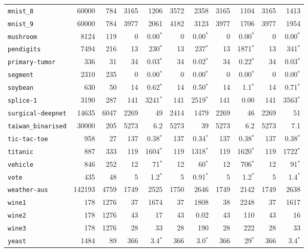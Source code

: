 \begin{tabular}{lccrrrrrrrr}
\texttt{mnist\_8} & \multicolumn{1}{r}{60000} & \multicolumn{1}{r}{784}  & 3165 & 1206 & 3572 & 2358 & 3165 & 1104 & 3165 & 1413\\
\texttt{mnist\_9} & \multicolumn{1}{r}{60000} & \multicolumn{1}{r}{784}  & 3977 & 2061 & 4182 & 3123 & 3977 & 1706 & 3977 & 1954\\
\texttt{mushroom} & \multicolumn{1}{r}{8124} & \multicolumn{1}{r}{119}  & 0 & 0.00$^*$ & 0 & 0.00$^*$ & 0 & 0.00$^*$ & 0 & 0.00$^*$\\
\texttt{pendigits} & \multicolumn{1}{r}{7494} & \multicolumn{1}{r}{216}  & 13 & 230$^*$ & 13 & 237$^*$ & 13 & 1871$^*$ & 13 & 341$^*$\\
\texttt{primary-tumor} & \multicolumn{1}{r}{336} & \multicolumn{1}{r}{31}  & 34 & 0.03$^*$ & 34 & 0.02$^*$ & 34 & 0.22$^*$ & 34 & 0.03$^*$\\
\texttt{segment} & \multicolumn{1}{r}{2310} & \multicolumn{1}{r}{235}  & 0 & 0.00$^*$ & 0 & 0.00$^*$ & 0 & 0.00$^*$ & 0 & 0.00$^*$\\
\texttt{soybean} & \multicolumn{1}{r}{630} & \multicolumn{1}{r}{50}  & 14 & 0.62$^*$ & 14 & 0.50$^*$ & 14 & 1.1$^*$ & 14 & 0.71$^*$\\
\texttt{splice-1} & \multicolumn{1}{r}{3190} & \multicolumn{1}{r}{287}  & 141 & 3241$^*$ & 141 & 2519$^*$ & 141 & 0.00 & 141 & 3563$^*$\\
\texttt{surgical-deepnet} & \multicolumn{1}{r}{14635} & \multicolumn{1}{r}{6047}  & 2269 & 49 & 2414 & 1479 & 2269 & 46 & 2269 & 51\\
\texttt{taiwan\_binarised} & \multicolumn{1}{r}{30000} & \multicolumn{1}{r}{205}  & 5273 & 6.2 & 5273 & 39 & 5273 & 6.2 & 5273 & 7.1\\
\texttt{tic-tac-toe} & \multicolumn{1}{r}{958} & \multicolumn{1}{r}{27}  & 137 & 0.38$^*$ & 137 & 0.34$^*$ & 137 & 0.38$^*$ & 137 & 0.38$^*$\\
\texttt{titanic} & \multicolumn{1}{r}{887} & \multicolumn{1}{r}{333}  & 119 & 1604$^*$ & 119 & 1318$^*$ & 119 & 1620$^*$ & 119 & 1722$^*$\\
\texttt{vehicle} & \multicolumn{1}{r}{846} & \multicolumn{1}{r}{252}  & 12 & 71$^*$ & 12 & 60$^*$ & 12 & 706$^*$ & 12 & 91$^*$\\
\texttt{vote} & \multicolumn{1}{r}{435} & \multicolumn{1}{r}{48}  & 5 & 1.2$^*$ & 5 & 0.91$^*$ & 5 & 1.2$^*$ & 5 & 1.4$^*$\\
\texttt{weather-aus} & \multicolumn{1}{r}{142193} & \multicolumn{1}{r}{4759}  & 1749 & 2525 & 1750 & 2646 & 1749 & 2142 & 1749 & 2638\\
\texttt{wine1} & \multicolumn{1}{r}{178} & \multicolumn{1}{r}{1276}  & 37 & 1674 & 37 & 1808 & 38 & 2248 & 37 & 1617\\
\texttt{wine2} & \multicolumn{1}{r}{178} & \multicolumn{1}{r}{1276}  & 43 & 17 & 43 & 0.02 & 43 & 110 & 43 & 16\\
\texttt{wine3} & \multicolumn{1}{r}{178} & \multicolumn{1}{r}{1276}  & 28 & 33 & 28 & 190 & 28 & 222 & 28 & 33\\
\texttt{yeast} & \multicolumn{1}{r}{1484} & \multicolumn{1}{r}{89}  & 366 & 3.4$^*$ & 366 & 3.0$^*$ & 366 & 29$^*$ & 366 & 3.4$^*$\\
\bottomrule
\end{tabular}
